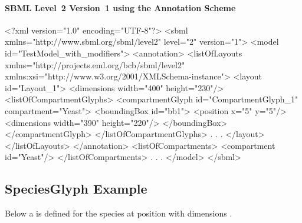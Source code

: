 \paragraph{SBML Level~2 Version~1 using the Annotation Scheme}
\begin{example}
<?xml version="1.0" encoding="UTF-8"?>
<sbml xmlns="http://www.sbml.org/sbml/level2" level="2" version="1">
  <model id="TestModel_with_modifiers">
    <annotation>
     <listOfLayouts xmlns="http://projects.eml.org/bcb/sbml/level2"
              xmlns:xsi="http://www.w3.org/2001/XMLSchema-instance">
      <layout id="Layout_1">
        <dimensions width="400" height="230"/>
        <listOfCompartmentGlyphs>
          <compartmentGlyph id="CompartmentGlyph_1" compartment="Yeast">
            <boundingBox id="bb1">
              <position x="5" y="5"/>
              <dimensions width="390" height="220"/>
            </boundingBox>
          </compartmentGlyph>
        </listOfCompartmentGlyphs>
                .
                .
                .
      </layout>
     </listOfLayouts>
    </annotation>
    <listOfCompartments>
      <compartment id="Yeast"/>
    </listOfCompartments>
        .
        .
        .
  </model> 
</sbml>
\end{example}

\subsection{SpeciesGlyph Example}
Below a \SpeciesGlyph is defined for the species  at 
position  with dimensions . 

\label{example:speciesglyph}
